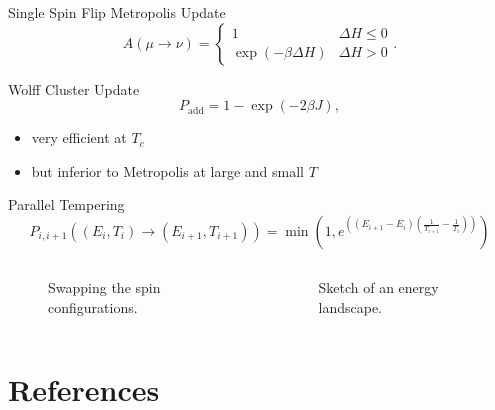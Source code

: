 \documentclass{beamer}
\newcommand{\brac}[1]{\ensuremath{\left(#1\right)}}
\begin{document}
        \begin{frame}{Single Spin Flip Metropolis Update \cite{Metropolis1953}}
            \begin{equation}
                A(\mu \to \nu) =
                \begin{cases}
                    1                            & \Delta H \le 0 \\
                    \exp{\brac{-\beta \Delta H}} & \Delta H > 0
                \end{cases}.
            \end{equation}
        \end{frame}

        \begin{frame}{Wolff Cluster Update \cite{Wolff1989}}
            \begin{equation}
                P_{\mathrm{add}} = 1-\exp\brac{-2\beta J},
            \end{equation}
            \pause
            \begin{itemize}[<+->]
                \item very efficient at \(T_{c}\)
                \item but inferior to Metropolis at large and small \(T\)
            \end{itemize}
        \end{frame}

        \begin{frame}{Parallel Tempering \cite{ParallelTempering1986}}
            \begin{equation}
                P_{i,i+1}((E_i,T_i) \to (E_{i+1},T_{i+1})) = \min\brac{1,e^{\brac{\brac{E_{i+1}-E_i}\brac{\frac{1}{T_{i+1}}-\frac{1}{T_i}}}}}
            \end{equation}
            \begin{columns}[b]
                \begin{column}{5cm}
                    \begin{figure}[htbp]
                        \centering
                        
                        \caption
                        {
                            Swapping the spin configurations.
                        }
                    \end{figure}
                \end{column}
                \pause
                \begin{column}{6cm}
                    \begin{figure}[htbp]
                        \centering
                        
                        \caption
                        {
                            Sketch of an energy landscape.
                        }
                    \end{figure}
                \end{column}
            \end{columns}
        \end{frame}

\section{References}
    \begin{frame}[allowframebreaks]
        
        
    \end{frame}
\end{document}
